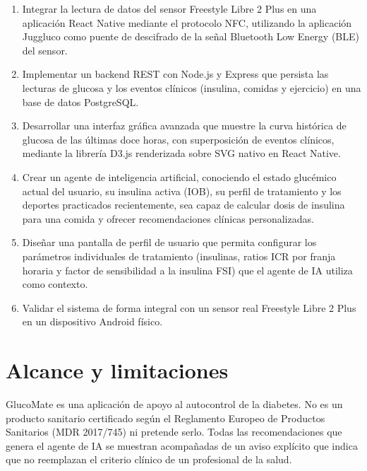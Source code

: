 \begin{enumerate}
    \item Integrar la lectura de datos del sensor Freestyle Libre 2 Plus en una
          aplicación React Native mediante el protocolo NFC, utilizando la aplicación
          Juggluco como puente de descifrado de la señal Bluetooth Low Energy (BLE)
          del sensor.

    \item Implementar un backend REST con Node.js y Express que persista las lecturas
          de glucosa y los eventos clínicos (insulina, comidas y ejercicio) en una
          base de datos PostgreSQL.

    \item Desarrollar una interfaz gráfica avanzada que muestre la curva histórica de
          glucosa de las últimas doce horas, con superposición de eventos clínicos,
          mediante la librería D3.js renderizada sobre SVG nativo en React Native.

    \item Crear un agente de inteligencia artificial,
          conociendo el estado glucémico actual del usuario, su
          insulina activa (IOB), su perfil de tratamiento y los deportes practicados
          recientemente, sea capaz de calcular dosis de insulina para una comida y
          ofrecer recomendaciones clínicas personalizadas.

    \item Diseñar una pantalla de perfil de usuario que permita configurar los
          parámetros individuales de tratamiento (insulinas, ratios ICR por franja
          horaria y factor de sensibilidad a la insulina FSI) que el agente de IA
          utiliza como contexto.

    \item Validar el sistema de forma integral con un sensor real Freestyle Libre 2
          Plus en un dispositivo Android físico.
\end{enumerate}

\section{Alcance y limitaciones}
\label{sec:alcance}

GlucoMate es una aplicación de apoyo al autocontrol de la diabetes. No es un
producto sanitario certificado según el Reglamento Europeo de Productos Sanitarios
(MDR 2017/745) ni pretende serlo. Todas las recomendaciones que genera el agente de IA
se muestran acompañadas de un aviso explícito que indica que no reemplazan el criterio
clínico de un profesional de la salud.

